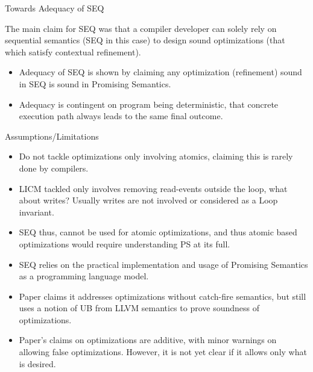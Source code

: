 \documentclass[xcolor=dvipsnames, notes]{beamer}
\begin{document}
    \begin{frame}{Towards Adequacy of SEQ}

        The main claim for SEQ was that a compiler developer can solely rely on sequential semantics (SEQ in this case) to design sound optimizations (that which satisfy contextual refinement). 
        \begin{itemize}
            \item Adequacy of SEQ is shown by claiming any optimization (refinement) sound in SEQ is sound in Promising Semantics.
            \item Adequacy is contingent on program being deterministic, that concrete execution path always leads to the same final outcome.
        \end{itemize}
        
    \end{frame}

    \begin{frame}{Assumptions/Limitations}

        \begin{itemize}
            \item Do not tackle optimizations only involving atomics, claiming this is rarely done by compilers. 
            \item LICM tackled only involves removing read-events outside the loop, what about writes? Usually writes are not involved or considered as a Loop invariant. 
            \item SEQ thus, cannot be used for atomic optimizations, and thus atomic based optimizations would require understanding PS at its full.
            \item SEQ relies on the practical implementation and usage of Promising Semantics as a programming language model.
            \item Paper claims it addresses optimizations without catch-fire semantics, but still uses a notion of UB from LLVM semantics to prove soundness of optimizations. 
            \item Paper's claims on optimizations are additive, with minor warnings on allowing false optimizations. However, it is not yet clear if it allows only what is desired.
        \end{itemize}
        
    \end{frame}
\end{document}
